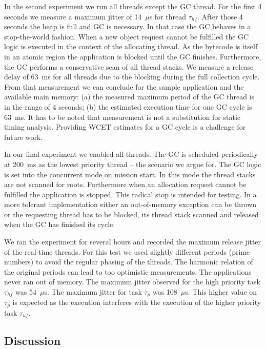 In the second experiment we run all threads except the GC thread.
For the first 4 seconds we measure a maximum jitter of 14~$\mu$s for
thread $\tau_{hf}$. After those 4 seconds the heap is full and GC is
necessary. In that case the GC behaves in a stop-the-world fashion.
When a new object request cannot be fulfilled the GC logic is
executed in the context of the allocating thread. As the bytecode
 is itself in an atomic region the application is blocked
until the GC finishes. Furthermore, the GC performs a conservative
scan of all thread stacks. We measure a release delay of 63~ms for
all threads due to the blocking during the full collection cycle.
From that measurement we can conclude for the sample application and
the available main memory: (a) the measured maximum period of the GC
thread is in the range of 4 seconds; (b) the estimated execution
time for one GC cycle is 63~ms. It has to be noted that measurement
is not a substitution for static timing analysis. Providing WCET
estimates for a GC cycle is a challenge for future work.

In our final experiment we enabled all threads. The GC is scheduled
periodically at 200~ms as the lowest priority thread -- the scenario
we argue for. The GC logic is set into the concurrent mode on mission
start. In this mode the thread stacks are not scanned for roots.
Furthermore when an allocation request cannot be fulfilled the
application is stopped. This radical stop is intended for testing. In
a more tolerant implementation either an out-of-memory exception can
be thrown or the requesting thread has to be blocked, its thread
stack scanned and released when the GC has finished its cycle.

We ran the experiment for several hours and recorded the maximum
release jitter of the real-time threads. For this test we used
slightly different periods (prime numbers) to avoid the regular
phasing of the threads. The harmonic relation of the original
periods can lead to too optimistic measurements. The applications
never ran out of memory. The maximum jitter observed for the high
priority task $\tau_{hf}$ was 54~$\mu$s. The maximum jitter for task
$\tau_{p}$ was 108~$\mu$s. This higher value on $\tau_{p}$ is
expected as the execution interferes with the execution of the
higher priority task $\tau_{hf}$.

\subsection{Discussion}


